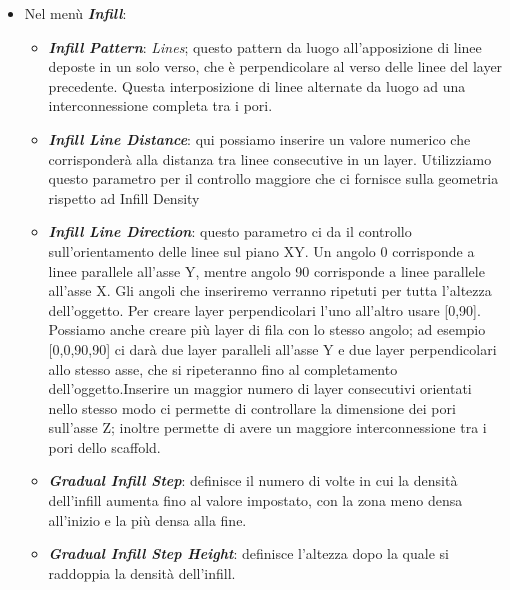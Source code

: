 \begin{itemize}
\item Nel menù \emph{\textbf{Infill}}:

\begin{itemize}
\item \textit{\textbf{Infill Pattern}}: \emph{Lines}; questo pattern da luogo all'apposizione di linee deposte in un solo verso, che è perpendicolare al verso delle linee del layer precedente. Questa interposizione di linee alternate da luogo ad una interconnessione completa tra i pori.
\item \emph{\textbf{Infill Line Distance}}: qui possiamo inserire un valore numerico che corrisponderà alla distanza tra linee consecutive in un layer. Utilizziamo questo parametro per il controllo maggiore che ci fornisce sulla geometria rispetto ad Infill Density
\item \emph{\textbf{Infill Line Direction}}: questo parametro ci da il controllo sull'ori\-en\-ta\-men\-to delle linee sul piano XY. Un angolo 0 corrisponde a linee parallele all'asse Y, mentre angolo 90 corrisponde a linee parallele all'asse X. Gli angoli che inseriremo verranno ripetuti per tutta l'altezza dell'oggetto. Per creare layer perpendicolari l'uno all'altro usare [0,90].
Possiamo anche creare più layer di fila con lo stesso angolo; ad esempio [0,0,90,90] ci darà due layer paralleli all'asse Y e due layer perpendicolari allo stesso asse, che si ripeteranno fino al completamento dell'oggetto.Inserire un maggior numero di layer consecutivi orientati nello stesso modo ci permette di controllare la dimensione dei pori sull'asse Z; inoltre permette di avere un maggiore interconnessione tra i pori dello scaffold.
\item \emph{\textbf{Gradual Infill Step}}: definisce il numero di volte in cui la densità dell'infill aumenta fino al valore impostato, con la zona meno densa all'inizio e la più densa alla fine.
\item \emph{\textbf{Gradual Infill Step Height}}: definisce l'altezza dopo la quale si raddoppia la densità dell'infill.
\end{itemize}

\end{itemize}

